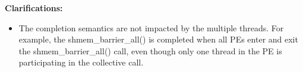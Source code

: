 {\bf Clarifications:}
 
\begin{itemize}
 

\item[]
The completion semantics are not impacted by the multiple threads. 
For example, the shmem\_barrier\_all() is completed when all \acp{PE} enter and
exit the shmem\_barrier\_all() call, even though only one thread in the \ac{PE} is
participating in the collective call. 

 
\end{itemize}
